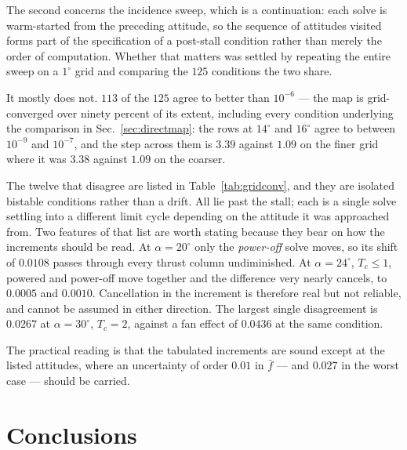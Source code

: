 \documentclass[submit]{aiaa-tc}%
\begin{document}
The second concerns the incidence sweep, which is a continuation: each
solve is warm-started from the preceding attitude, so the sequence of
attitudes visited forms part of the specification of a post-stall
condition rather than merely the order of computation. Whether that
matters was settled by repeating the entire sweep on a $1^\circ$ grid and
comparing the $125$ conditions the two share.

It mostly does not. $113$ of the $125$ agree to better than $10^{-6}$ ---
the map is grid-converged over ninety percent of its extent, including
every condition underlying the comparison in Sec.~\ref{sec:directmap}: the
rows at $14^\circ$ and $16^\circ$ agree to between $10^{-9}$ and
$10^{-7}$, and the step across them is $3.39$ against $1.09$ on the finer
grid where it was $3.38$ against $1.09$ on the coarser.

The twelve that disagree are listed in Table~\ref{tab:gridconv}, and they
are isolated bistable conditions rather than a drift. All lie past the
stall; each is a single solve settling into a different limit cycle
depending on the attitude it was approached from. Two features of that
list are worth stating because they bear on how the increments should be
read. At $\alpha = 20^\circ$ only the \emph{power-off} solve moves, so its
shift of $0.0108$ passes through every thrust column undiminished. At
$\alpha = 24^\circ$, $T_c \leq 1$, powered and power-off move together and
the difference very nearly cancels, to $0.0005$ and $0.0010$. Cancellation
in the increment is therefore real but not reliable, and cannot be assumed
in either direction. The largest single disagreement is $0.0267$ at
$\alpha = 30^\circ$, $T_c = 2$, against a fan effect of $0.0436$ at the
same condition.

\begin{table}[tb]
  \centering
  \caption{Conditions at which the $2^\circ$ map and a $1^\circ$ repeat of
    the same sweep disagree by more than $10^{-6}$, with the solve
    responsible. All are past the stall.}
  \label{tab:gridconv}
  
\end{table}

The practical reading is that the tabulated increments are sound except at
the listed attitudes, where an uncertainty of order $0.01$ in $\bar f$ ---
and $0.027$ in the worst case --- should be carried.


\section{Conclusions}
\label{sec:conclusions}
\end{document}
